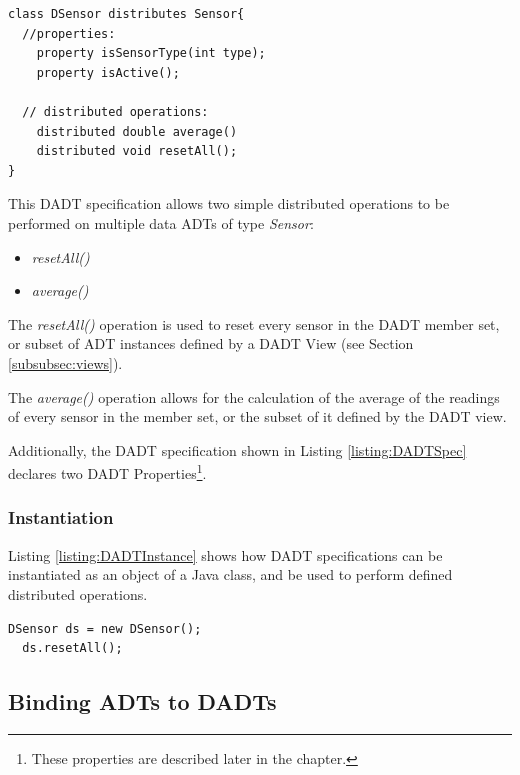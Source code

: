 \begin{lstlisting}[frame=trbl, basewidth={0.55em, 0.6em}, captionpos=b, 
basicstyle=\ttfamily\footnotesize, breaklines, caption = Data DADT 
specification (reproduced from \cite{migliavacca_DADT:2006}), label = listing:DADTSpec]
class DSensor distributes Sensor{	
  //properties:
    property isSensorType(int type);
    property isActive();

  // distributed operations:
    distributed double average()	
    distributed void resetAll();
}
\end{lstlisting} 
 
This DADT specification allows two simple distributed operations to be performed
on multiple data ADTs of type \emph{Sensor}:  
\begin{itemize}
\item \emph{resetAll()} 
\item \emph{average()} 
\end{itemize}

The \emph{resetAll()} operation is used to reset every sensor in the DADT member
set, or subset of ADT instances defined by a DADT View (see Section
\ref{subsubsec:views}).

The \emph{average()} operation allows for the calculation of the average of the readings of every
sensor in the member set, or the subset of it defined by the DADT view.

Additionally, the DADT specification  shown in Listing \ref{listing:DADTSpec}
declares two DADT Properties\footnote{These properties are described later in the chapter.}.

\subsubsection{Instantiation}

Listing \ref{listing:DADTInstance} shows how DADT specifications can be
instantiated as an object of a Java class, and be used to perform defined
distributed operations.

\begin{lstlisting}[frame=trbl, basewidth={0.55em, 0.6em}, captionpos=b, 
basicstyle=\ttfamily\footnotesize, breaklines, caption = DADT Instantiation 
(reproduced from \cite{migliavacca_DADT:2006}), label = listing:DADTInstance ]
  DSensor ds = new DSensor();
  ds.resetAll();
\end{lstlisting}

\subsection{Binding ADTs to DADTs}

